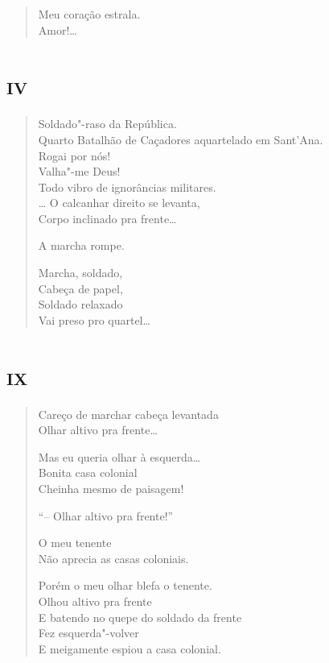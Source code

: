 {\begin{verse}
Meu coração estrala.\\
Amor!\ldots{}
\end{verse}

\chapter[«Soldado"-raso da República»]{\textsc{iv}}

\begin{verse}
Soldado"-raso da República.\\
Quarto Batalhão de Caçadores aquartelado em Sant'Ana.\\
\hfill{}Rogai por nós!\\
\qquad\qquad\qquad\qquad\qquad\qquad\qquad{}Valha"-me Deus!\\
\quad\qquad\qquad{}Todo vibro de ignorâncias militares.\\
\qquad\quad{}\ldots{} O calcanhar direito se levanta,\\
\qquad\quad{}Corpo inclinado pra frente\ldots{}

A marcha rompe.

\qquad\quad\quad{}Marcha, soldado,\\
\qquad\quad\quad{}Cabeça de papel,\\
\qquad\quad\quad{}Soldado relaxado\\
\qquad\quad\quad{}Vai preso pro quartel\ldots{}
\end{verse}

\chapter[«Careço de marchar cabeça levantada»]{\textsc{ix}}

\begin{verse}
Careço de marchar cabeça levantada\\
Olhar altivo pra frente\ldots{}

Mas eu queria olhar à esquerda\ldots{}\\
\qquad\qquad\qquad\qquad{}Bonita casa colonial\\
\qquad\qquad\qquad\qquad{}Cheinha mesmo de paisagem!

``-- Olhar altivo pra frente!''

O meu tenente\\
Não aprecia as casas coloniais.

Porém o meu olhar blefa o tenente.\\
Olhou altivo pra frente\\
E batendo no quepe do soldado da frente\\
Fez esquerda"-volver\\
E meigamente espiou a casa colonial.
\end{verse}

}
